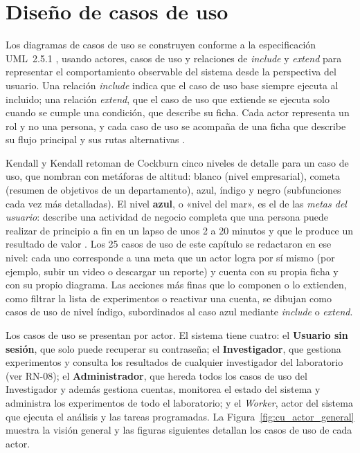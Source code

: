 \section{Diseño de casos de uso}

Los diagramas de casos de uso se construyen conforme a la especificación UML~2.5.1
\cite{omg_uml}, usando actores, casos de uso y relaciones de
\textit{include} y \textit{extend} para representar el comportamiento observable
del sistema desde la perspectiva del usuario. Una relación \textit{include} indica que el
caso de uso base siempre ejecuta al incluido; una relación \textit{extend}, que el caso de
uso que extiende se ejecuta solo cuando se cumple una condición, que describe su ficha.
Cada actor representa un rol y no una persona, y cada caso de uso se acompaña de una ficha que
describe su flujo principal y sus rutas alternativas \cite{kendall2011}.

Kendall y Kendall retoman de Cockburn cinco niveles de detalle para un caso de uso, que
nombran con metáforas de altitud: blanco (nivel empresarial), cometa (resumen de objetivos de
un departamento), azul, índigo y negro (subfunciones cada vez más detalladas). El nivel
\textbf{azul}, o «nivel del mar», es el de las \emph{metas del usuario}: describe una
actividad de negocio completa que una persona puede realizar de principio a fin en un lapso de
unos 2 a 20 minutos y que le produce un resultado de valor \cite{kendall2011}.
Los 25 casos de uso de este capítulo se redactaron en ese nivel: cada uno corresponde a una
meta que un actor logra por sí mismo (por ejemplo, subir un video o descargar un reporte) y
cuenta con su propia ficha y con su propio diagrama. Las acciones más finas que lo componen o
lo extienden, como filtrar la lista de experimentos o reactivar una cuenta, se dibujan como
casos de uso de nivel índigo, subordinados al caso azul mediante \textit{include} o \textit{extend}.

Los casos de uso se presentan por actor. El sistema tiene cuatro:
el \textbf{Usuario sin sesión}, que solo puede recuperar su contraseña; el
\textbf{Investigador}, que gestiona experimentos y consulta los resultados de cualquier
investigador del laboratorio (ver RN-08); el \textbf{Administrador}, que hereda todos los casos
de uso del Investigador y además gestiona cuentas, monitorea el estado del sistema y administra
los experimentos de todo el laboratorio; y el \textit{Worker}, actor del sistema que ejecuta el
análisis y las tareas programadas. La Figura~\ref{fig:cu_actor_general} muestra la visión
general y las figuras siguientes detallan los casos de uso de cada actor.

